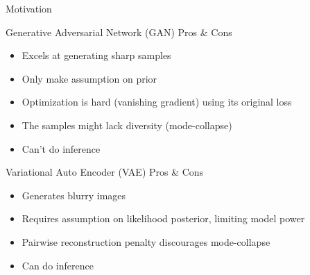 \documentclass[compress]{beamer}
\begin{document}
\begin{frame}{Motivation}
    \begin{block}{Generative Adversarial Network (GAN) Pros \& Cons}
        \begin{itemize}
            \item Excels at generating sharp samples
            \item Only make assumption on prior
            \item Optimization is hard (vanishing gradient) using its original loss
            \item The samples might lack diversity (mode-collapse)
            \item Can't do inference
        \end{itemize} 
    \end{block}  
    \begin{block}{Variational Auto Encoder (VAE) Pros \& Cons}
        \begin{itemize}
            \item Generates blurry images
            \item Requires assumption on likelihood posterior, limiting model power
            \item Pairwise reconstruction penalty discourages mode-collapse
            \item Can do inference
        \end{itemize}
    \end{block}
\end{frame}
\end{document}
